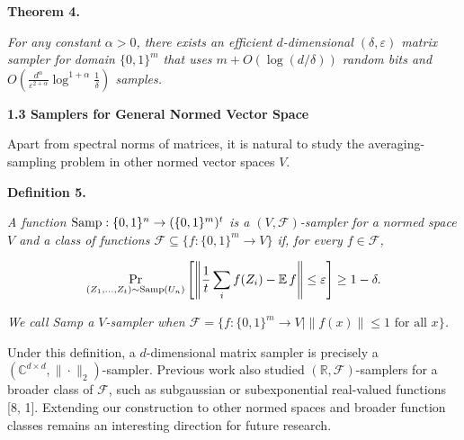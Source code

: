 

\par\medskip\noindent\textbf{
\textbf{Theorem 4}\textbf{.}
}\par



\emph{For any constant $\alpha>0$, there exists an efficient $d$-dimensional $(\delta,\varepsilon)$ matrix sampler for domain $\{0,1\}^{m}$ that uses $m+O(\log(d/\delta))$ random bits and $O(\frac{d^{\alpha}}{\varepsilon^{2+\alpha}}\log^{1+\alpha}\frac{1}{\delta})$ samples.}\par







\par\medskip\noindent\textbf{
1.3 Samplers for General Normed Vector Space}\par




Apart from spectral norms of matrices, it is natural to study the averaging-sampling problem in other normed vector spaces $V$.\par





\par\medskip\noindent\textbf{
\textbf{Definition 5}\textbf{.}
}\par



\emph{A function $\textup{{Samp}}:\{0,1\}^{n}\to(\{0,1\}^{m})^{t}$ is a $(V,\mathcal{F})$-sampler for a normed space $V$ and a class of functions $\mathcal{F}\subseteq\{f:\{0,1\}^{m}\to V\}$ if, for every $f\in\mathcal{F}$,}\par


\[\begin{gathered}
\Pr_{(Z_{1},\dots,Z_{t})\sim\textup{{Samp}}(U_{n})}\left[\left\lVert\frac{1}{t}\sum_{i}f(Z_{i})-\operatorname*{\mathbb{E}}f\right\rVert\leq\varepsilon\right]\geq 1-\delta.
\end{gathered}\]


\emph{We call Samp a $V$-sampler when $\mathcal{F}=\{f:\{0,1\}^{m}\to V\mid\|f(x)\|\leq 1\text{ for all }x\}$.}\par






Under this definition, a $d$-dimensional matrix sampler is precisely a $(\mathbb{C}^{d\times d},\|\cdot\|_{2})$-sampler. Previous work also studied $(\mathbb{R},\mathcal{F})$-samplers for a broader class of $\mathcal{F}$, such as subgaussian or subexponential real-valued functions [8, 1]. Extending our construction to other normed spaces and broader function classes remains an interesting direction for future research.\par





